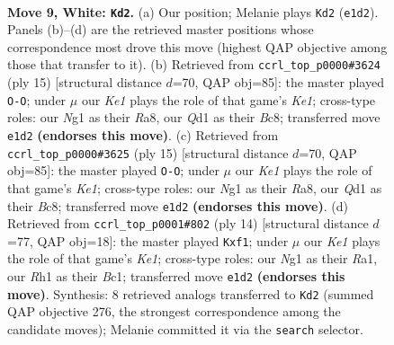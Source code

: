 \documentclass[11pt]{article}
\begin{document}
\clearpage

\begin{figure}[p]\centering
\begin{subfigure}{0.46\textwidth}\centering
\resizebox{\linewidth}{!}{%
\newchessgame
\chessboard[
  setfen={rn1qkb1r/3p1p2/b4np1/2pPp2p/4P3/2N1B3/PP3PPP/R2QKBNR w KQkq e6 0 9},
  showmover=false,
  pgfstyle=straightmove, color=movearrow, markmove={e1-d2}
]}
\caption{}
\end{subfigure}\hfill
\begin{subfigure}{0.46\textwidth}\centering
\resizebox{\linewidth}{!}{%
\newchessgame
\chessboard[
  setfen={r1bqk2r/pp2ppbp/2n3pn/3pP3/3P4/2N2N1P/PP3PP1/R1BQKB1R b KQkq - 2 8},
  showmover=false,
  pgfstyle=straightmove, color=movearrow, markmove={e8-g8}
]}
\caption{}
\end{subfigure}
\\[4pt]
\begin{subfigure}{0.46\textwidth}\centering
\resizebox{\linewidth}{!}{%
\newchessgame
\chessboard[
  setfen={r1bqk2r/pp2ppbp/2n3pn/3pP3/3P4/2N2N1P/PP3PP1/R1BQKB1R b KQkq - 2 8},
  showmover=false,
  pgfstyle=straightmove, color=movearrow, markmove={e8-g8}
]}
\caption{}
\end{subfigure}\hfill
\begin{subfigure}{0.46\textwidth}\centering
\resizebox{\linewidth}{!}{%
\newchessgame
\chessboard[
  setfen={rn1qkb1r/3ppp1p/5np1/2pP4/4P3/2N5/PP3PPP/R1BQKbNR w KQkq - 0 8},
  showmover=false,
  pgfstyle=straightmove, color=movearrow, markmove={e1-f1}
]}
\caption{}
\end{subfigure}
\caption{\textbf{Move 9, White: \texttt{Kd2}.} (a) Our position; Melanie plays \texttt{Kd2} (\texttt{e1d2}). Panels (b)--(d) are the retrieved master positions whose correspondence most drove this move (highest QAP objective among those that transfer to it). (b) Retrieved from \texttt{ccrl\_top\_p0000\#3624} (ply 15) [structural distance $d$=70, QAP obj=85]: the master played \texttt{O-O}; under $\mu$ our \emph{Ke1} plays the role of that game's \emph{Ke1}; cross-type roles: our \emph{N}g1 as their \emph{R}a8, our \emph{Q}d1 as their \emph{B}c8; transferred move \texttt{e1d2} \textbf{(endorses this move)}. (c) Retrieved from \texttt{ccrl\_top\_p0000\#3625} (ply 15) [structural distance $d$=70, QAP obj=85]: the master played \texttt{O-O}; under $\mu$ our \emph{Ke1} plays the role of that game's \emph{Ke1}; cross-type roles: our \emph{N}g1 as their \emph{R}a8, our \emph{Q}d1 as their \emph{B}c8; transferred move \texttt{e1d2} \textbf{(endorses this move)}. (d) Retrieved from \texttt{ccrl\_top\_p0001\#802} (ply 14) [structural distance $d$=77, QAP obj=18]: the master played \texttt{Kxf1}; under $\mu$ our \emph{Ke1} plays the role of that game's \emph{Ke1}; cross-type roles: our \emph{N}g1 as their \emph{R}a1, our \emph{R}h1 as their \emph{B}c1; transferred move \texttt{e1d2} \textbf{(endorses this move)}. Synthesis: 8 retrieved analogs transferred to \texttt{Kd2} (summed QAP objective 276, the strongest correspondence among the candidate moves); Melanie committed it via the \texttt{search} selector.}
\label{fig:thought-m16}
\end{figure}
\end{document}
